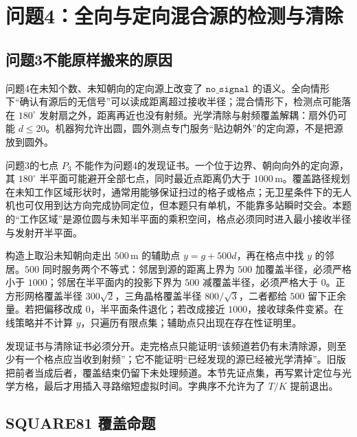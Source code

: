 \section{问题4：全向与定向混合源的检测与清除}

\subsection{问题3不能原样搬来的原因}

问题4在未知个数、未知朝向的定向源上改变了 $\mathtt{no\_signal}$ 的语义。全向情形下“确认有源后的无信号”可以读成距离超过接收半径；混合情形下，检测点可能落在 $180^\circ$ 发射扇之外，距离再近也没有射频。光学清除与射频覆盖解耦：扇外仍可能 $d\le 20$。机器狗允许出圆，圆外测点专门服务“贴边朝外”的定向源，不是把源放到圆外。

问题3的七点 $P_3$ 不能作为问题4的发现证书。一个位于边界、朝向向外的定向源，其 $180^\circ$ 半平面可能避开全部七点，同时最近点距离仍大于 $1000\,\mathrm{m}$。覆盖路径规划在未知工作区域形状时，通常用能够保证扫过的格子或格点；无卫星条件下的无人机也可仅用到达方向完成协同定位，但本题只有单机，不能靠多站瞬时交会。本题的“工作区域”是源位圆与未知半平面的乘积空间，格点必须同时进入最小接收半径与发射开半平面。

构造上取沿未知朝向走出 $500\,\mathrm{m}$ 的辅助点 $y=g+500d$，再在格点中找 $y$ 的邻居。$500$ 同时服务两个不等式：邻居到源的距离上界为 $500$ 加覆盖半径，必须严格小于 $1000$；邻居在半平面内的投影下界为 $500$ 减覆盖半径，必须严格大于 $0$。正方形网格覆盖半径 $300\sqrt{2}$，三角晶格覆盖半径 $800/\sqrt{3}$，二者都给 $500$ 留下正余量。若把偏移改成 $0$，半平面条件退化；若改成接近 $1000$，接收球条件变紧。在线策略并不计算 $y$，只遍历有限点集；辅助点只出现在存在性证明里。

发现证书与清除证书必须分开。走完格点只能证明“该频道若仍有未清除源，则至少有一个格点应当收到射频”；它不能证明“已经发现的源已经被光学清掉”。旧版把前者当成后者，覆盖结束仍留下未处理频道。本节先证点集，再写累计定位与光学方格，最后才用插入寻路缩短虚拟时间。字典序不允许为了 $T/K$ 提前退出。

\subsection{SQUARE81 覆盖命题}

